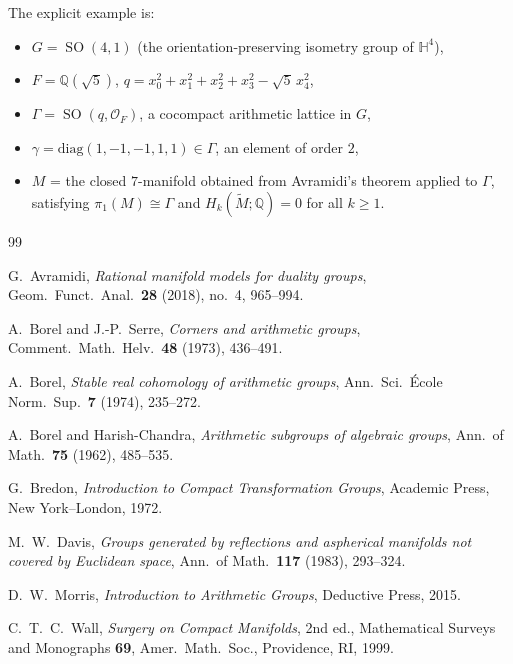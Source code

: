 \documentclass[12pt]{article}
\theoremstyle{definition}
\DeclareMathOperator{\SO}{SO}
\begin{document}
The explicit example is:
\begin{itemize}
  \item $G = \SO(4,1)$ (the orientation-preserving isometry group of $\mathbb{H}^4$),
  \item $F = \mathbb{Q}(\sqrt{5})$, $q = x_0^2 + x_1^2 + x_2^2 + x_3^2 - \sqrt{5}\,x_4^2$,
  \item $\Gamma = \SO(q, \mathcal{O}_F)$, a cocompact arithmetic lattice in $G$,
  \item $\gamma = \mathrm{diag}(1,-1,-1,1,1) \in \Gamma$, an element of order $2$,
  \item $M$ = the closed $7$-manifold obtained from Avramidi's theorem applied to $\Gamma$,
    satisfying $\pi_1(M) \cong \Gamma$ and $H_k(\widetilde{M};\mathbb{Q}) = 0$ for all
    $k \geq 1$.
\end{itemize}

\begin{thebibliography}{99}

G.~Avramidi,
\textit{Rational manifold models for duality groups},
Geom.\ Funct.\ Anal.\ \textbf{28} (2018), no.~4, 965--994.

A.~Borel and J.-P.~Serre,
\textit{Corners and arithmetic groups},
Comment.\ Math.\ Helv.\ \textbf{48} (1973), 436--491.

A.~Borel,
\textit{Stable real cohomology of arithmetic groups},
Ann.\ Sci.\ \'Ecole Norm.\ Sup.\ \textbf{7} (1974), 235--272.

A.~Borel and Harish-Chandra,
\textit{Arithmetic subgroups of algebraic groups},
Ann.\ of Math.\ \textbf{75} (1962), 485--535.

G.~Bredon,
\textit{Introduction to Compact Transformation Groups},
Academic Press, New York--London, 1972.

M.~W.~Davis,
\textit{Groups generated by reflections and aspherical manifolds not covered by Euclidean space},
Ann.\ of Math.\ \textbf{117} (1983), 293--324.

D.~W.~Morris,
\textit{Introduction to Arithmetic Groups},
Deductive Press, 2015.

C.~T.~C.~Wall,
\textit{Surgery on Compact Manifolds}, 2nd ed.,
Mathematical Surveys and Monographs \textbf{69},
Amer.\ Math.\ Soc., Providence, RI, 1999.

\end{thebibliography}
\end{document}
